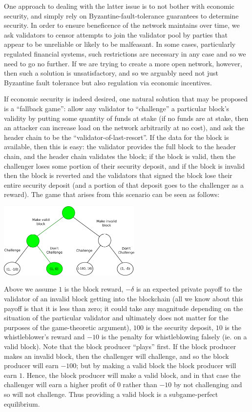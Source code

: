 \documentclass[11pt,a4paper]{report}
\theoremstyle{plain}
\theoremstyle{definition}
\theoremstyle{remark}
\begin{document}
One approach to dealing with the latter issue is to not bother with economic security, and simply rely on Byzantine-fault-tolerance guarantees to determine security. In order to ensure beneficence of the network maintains over time, we ask validators to censor attempts to join the validator pool by parties that appear to be unreliable or likely to be malfeasant. In some cases, particularly regulated financial systems, such restrictions are necessary in any case and so we need to go no further\cite{swanson}. If we are trying to create a more open network, however, then such a solution is unsatisfactory, and so we arguably need not just Byzantine fault tolerance but also regulation via economic incentives.

If economic security is indeed desired, one natural solution that may be proposed is a ``fallback game'': allow any validator to ``challenge'' a particular block's validity by putting some quantity of funds at stake (if no funds are at stake, then an attacker can increase load on the network arbitrarily at no cost), and ask the header chain to be the ``validator-of-last-resort''. If the data for the block is available, then this is easy: the validator provides the full block to the header chain, and the header chain validates the block; if the block is valid, then the challenger loses some portion of their security deposit, and if the block is invalid then the block is reverted and the validators that signed the block lose their entire security deposit (and a portion of that deposit goes to the challenger as a reward). The game that arises from this scenario can be seen as follows:

\begin{center}
\includegraphics[width=200pt]{figs/pdfs/game.pdf}
\end{center}

Above we assume $1$ is the block reward, $-\delta$ is an expected private payoff to the validator of an invalid block getting into the blockchain (all we know about this payoff is that it is less than zero; it could take any magnitude depending on the situation of the particular validator and ultimately does not matter for the purposes of the game-theoretic argument), $100$ is the security deposit, $10$ is the whistleblower's reward and $-10$ is the penalty for whistleblowing falsely (ie. on a valid block). Note that the block producer ``plays'' first. If the block producer makes an invalid block, then the challenger will challenge, and so the block producer will earn $-100$; but by making a valid block the block producer will earn $1$. Hence, the block producer will make a valid block, and in that case the challenger will earn a higher profit of $0$ rather than $-10$ by not challenging and so will not challenge. Thus providing a valid block is a subgame-perfect equilibrium.
\end{document}

